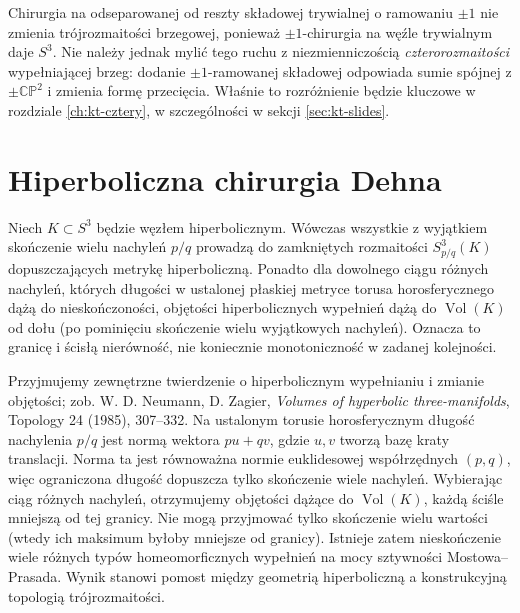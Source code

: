 \begin{uwaga}
Chirurgia na odseparowanej od reszty składowej trywialnej
o ramowaniu $\pm1$ nie zmienia trójrozmaitości brzegowej,
ponieważ $\pm1$-chirurgia na węźle trywialnym daje $S^3$.
Nie należy jednak mylić tego ruchu z niezmienniczością
\emph{czterorozmaitości} wypełniającej brzeg: dodanie
$\pm1$-ramowanej składowej odpowiada sumie spójnej
z $\pm\mathbb{CP}^2$ i zmienia formę przecięcia.
Właśnie to rozróżnienie będzie kluczowe w rozdziale
\ref{ch:kt-cztery}, w szczególności w sekcji \ref{sec:kt-slides}.
\end{uwaga}

\section{Hiperboliczna chirurgia Dehna}
\label{sec:kt-hyper-dehn}

\begin{twierdzenie}
Niech $K\subset S^3$ będzie węzłem hiperbolicznym.
Wówczas wszystkie z wyjątkiem skończenie wielu nachyleń
$p/q$ prowadzą do zamkniętych rozmaitości
$S^3_{p/q}(K)$ dopuszczających metrykę hiperboliczną.
Ponadto dla dowolnego ciągu różnych nachyleń, których
długości w ustalonej płaskiej metryce torusa horosferycznego
dążą do nieskończoności, objętości hiperbolicznych wypełnień
dążą do $\operatorname{Vol}(K)$ od dołu
(po pominięciu skończenie wielu wyjątkowych nachyleń).
Oznacza to granicę i ścisłą nierówność, nie
koniecznie monotoniczność w zadanej kolejności.
\end{twierdzenie}

\begin{uwaga}
Przyjmujemy zewnętrzne twierdzenie o hiperbolicznym
wypełnianiu i zmianie objętości; zob. W. D. Neumann,
D. Zagier, \emph{Volumes of hyperbolic three-manifolds},
Topology 24 (1985), 307--332.
Na ustalonym torusie horosferycznym długość nachylenia
$p/q$ jest normą wektora $p u+q v$, gdzie $u,v$
tworzą bazę kraty translacji. Norma ta jest równoważna
normie euklidesowej współrzędnych $(p,q)$, więc
ograniczona długość dopuszcza tylko skończenie wiele
nachyleń. Wybierając ciąg różnych nachyleń, otrzymujemy
objętości dążące do $\operatorname{Vol}(K)$, każdą
ściśle mniejszą od tej granicy. Nie mogą przyjmować
tylko skończenie wielu wartości (wtedy ich maksimum
byłoby mniejsze od granicy). Istnieje zatem
nieskończenie wiele różnych typów homeomorficznych
wypełnień na mocy sztywności Mostowa--Prasada. Wynik stanowi pomost między geometrią
hiperboliczną a konstrukcyjną topologią trójrozmaitości.
\end{uwaga}



